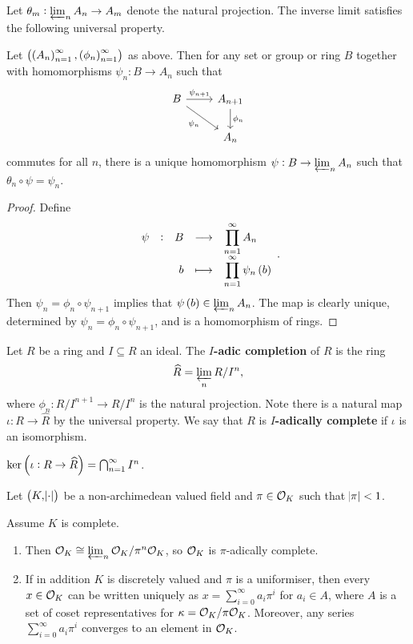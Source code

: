 Let $ \theta_m : \varprojlim_n A_n \to A_m $ denote the natural projection. The inverse limit satisfies the following universal property.

\begin{proposition}
Let $ \br{\br{A_n}_{n = 1}^\infty, \br{\phi_n}_{n = 1}^\infty} $ as above. Then for any set or group or ring $ B $ together with homomorphisms $ \psi_n : B \to A_n $ such that
$$
\begin{tikzcd}
B \arrow{r}{\psi_{n + 1}} \arrow{dr}[swap]{\psi_n} & A_{n + 1} \arrow{d}{\phi_n} \\
& A_n
\end{tikzcd}
$$
commutes for all $ n $, there is a unique homomorphism $ \psi : B \to \varprojlim_n A_n $ such that $ \theta_n \circ \psi = \psi_n $.
\end{proposition}

\begin{proof}
Define
$$ \function[\psi]{B}{\prod_{n = 1}^\infty A_n}{b}{\prod_{n = 1}^\infty \psi_n\br{b}}. $$
Then $ \psi_n = \phi_n \circ \psi_{n + 1} $ implies that $ \psi\br{b} \in \varprojlim_n A_n $. The map is clearly unique, determined by $ \psi_n = \phi_n \circ \psi_{n + 1} $, and is a homomorphism of rings.
\end{proof}

\pagebreak

\begin{definition}
Let $ R $ be a ring and $ I \subseteq R $ an ideal. The \textbf{$ I $-adic completion} of $ R $ is the ring
$$ \widehat{R} = \varprojlim_n R / I^n, $$
where $ \phi_n : R / I^{n + 1} \to R / I^n $ is the natural projection. Note there is a natural map $ \iota : R \to \widehat{R} $ by the universal property. We say that $ R $ is \textbf{$ I $-adically complete} if $ \iota $ is an isomorphism.
\end{definition}

\begin{fact*}
$ \ker \br{\iota : R \to \widehat{R}} = \bigcap_{n = 1}^\infty I^n $.
\end{fact*}

Let $ \br{K, \abs{\cdot}} $ be a non-archimedean valued field and $ \pi \in \mathcal{O}_K $ such that $ \abs{\pi} < 1 $.

\begin{proposition}
\label{prop:3.5}
Assume $ K $ is complete.
\begin{enumerate}
\item Then $ \mathcal{O}_K \cong \varprojlim_n \mathcal{O}_K / \pi^n\mathcal{O}_K $, so $ \mathcal{O}_K $ is $ \pi $-adically complete.
\item If in addition $ K $ is discretely valued and $ \pi $ is a uniformiser, then every $ x \in \mathcal{O}_K $ can be written uniquely as $ x = \sum_{i = 0}^\infty a_i\pi^i $ for $ a_i \in A $, where $ A $ is a set of coset representatives for $ \kappa = \mathcal{O}_K / \pi\mathcal{O}_K $. Moreover, any series $ \sum_{i = 0}^\infty a_i\pi^i $ converges to an element in $ \mathcal{O}_K $.
\end{enumerate}
\end{proposition}


